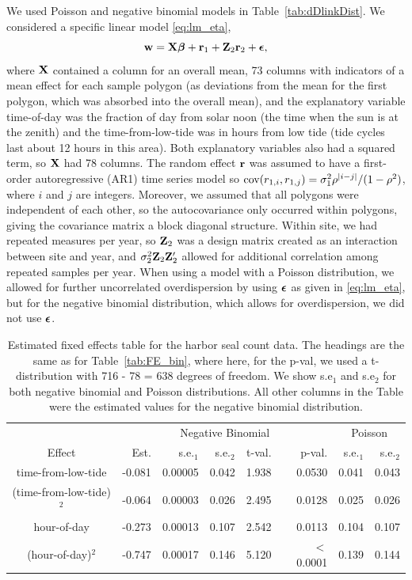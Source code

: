 \documentclass[12pt, titlepage]{article}
\begin{document}
We used Poisson and negative binomial models in Table~\ref{tab:dDlinkDist}.  We considered a specific linear model \eqref{eq:lm_eta},
$$
\mathbf{w} = \mathbf{X}\boldsymbol{\beta} + \mathbf{r}_{1} + \mathbf{Z}_{2}\mathbf{r}_{2} + \mbox{\boldmath $\epsilon$},
$$
where $\mathbf{X}$ contained a column for an overall mean, 73 columns with indicators of a mean effect for each sample polygon (as deviations from the mean for the first polygon, which was absorbed into the overall mean), and the explanatory variable time-of-day was the fraction of day from solar noon (the time when the sun is at the zenith) and the time-from-low-tide was in hours from low tide (tide cycles last about 12 hours in this area).  Both explanatory variables also had a squared term, so $\mathbf{X}$ had 78 columns. The random effect $\mathbf{r}$ was assumed to have a first-order autoregressive (AR1) time series model so $\textrm{cov}(r_{1,i}, r_{1,j}) = \sigma^{2}_{1}\rho^{|i - j|}/(1 - \rho^{2})$, where $i$ and $j$ are integers.  Moreover, we assumed that all polygons were independent of each other, so the autocovariance only occurred within polygons, giving the covariance matrix a block diagonal structure. Within site, we had repeated measures per year, so $\mathbf{Z}_{2}$ was a design matrix created as an interaction between site and year, and $\sigma^{2}_{2}\mathbf{Z}_{2}\mathbf{Z}_{2}^{\prime}$ allowed for additional correlation among repeated samples per year. When using a model with a Poisson distribution, we allowed for further uncorrelated overdispersion by using $\mbox{\boldmath $\epsilon$}$ as given in \eqref{eq:lm_eta}, but for the negative binomial distribution, which allows for overdispersion, we did not use $\mbox{\boldmath $\epsilon$}$.
{}
\begin{table}[H] 
	\caption{Estimated fixed effects table for the harbor seal count data. The headings are the same as for Table~\ref{tab:FE_bin}, where here, for the p-val, we used a t-distribution with 716 - 78 = 638 degrees of freedom.  We show s.e$_{1}$ and s.e$_{2}$ for both negative binomial and Poisson distributions.  All other columns in the Table were the estimated values for the negative binomial distribution.  \label{tab:FE_seals}}
\begin{center}
\begin{tabular}{|c|rrrrr|rr|}
\hline
\hline{}
{} &  \multicolumn{5}{c|}{Negative Binomial}  & \multicolumn{2}{c|}{Poisson} \\
Effect & Est. & s.e.$_{1}$ & s.e.$_{2}$  & t-val. & p-val. & s.e.$_{1}$ & s.e.$_{2}$ \\
\hline{}
time-from-low-tide & -0.081 & 0.00005 & 0.042 & 1.938 & 0.0530 & 0.041 & 0.043 \\ 
(time-from-low-tide)$^{2}$ & -0.064 & 0.00003 & 0.026 & 2.495 & 0.0128 & 0.025 & 0.026 \\ 
hour-of-day & -0.273 & 0.00013 & 0.107 & 2.542 & 0.0113 & 0.104 & 0.107 \\ 
(hour-of-day)$^{2}$ & -0.747 & 0.00017 & 0.146 & 5.120 & $<$0.0001 & 0.139 & 0.144 \\ 
\hline
\hline
\end{tabular}
\end{center}
\end{table}
\end{document}

